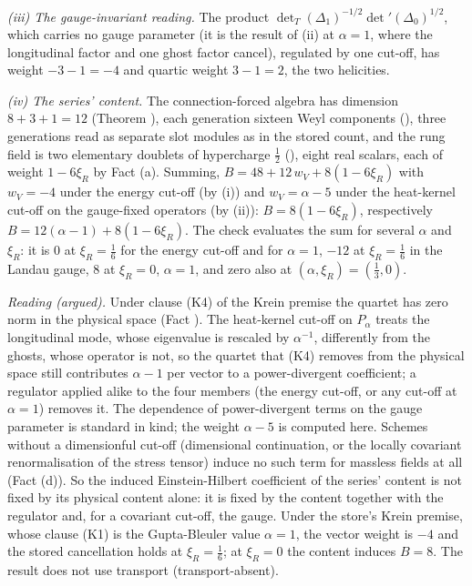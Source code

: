 \emph{(iii) The gauge-invariant reading.} The product $\det_{T}(\Delta_{1})^{-1/2}\det{}'(\Delta_{0})^{1/2}$, which carries no gauge parameter (it is the result of (ii) at $\alpha = 1$, where the longitudinal factor and one ghost factor cancel), regulated by one cut-off, has weight $-3 - 1 = -4$ and quartic weight $3 - 1 = 2$, the two helicities.

\emph{(iv) The series' content.} The connection-forced algebra has dimension $8 + 3 + 1 = 12$ (Theorem ), each generation sixteen Weyl components (), three generations read as separate slot modules as in the stored count, and the rung field is two elementary doublets of hypercharge $\tfrac12$ (), eight real scalars, each of weight $1 - 6\xi_{R}$ by Fact (a). Summing, $B = 48 + 12\,w_{V} + 8(1 - 6\xi_{R})$ with $w_{V} = -4$ under the energy cut-off (by (i)) and $w_{V} = \alpha - 5$ under the heat-kernel cut-off on the gauge-fixed operators (by (ii)): $B = 8(1 - 6\xi_{R})$, respectively $B = 12(\alpha - 1) + 8(1 - 6\xi_{R})$. The check evaluates the sum for several $\alpha$ and $\xi_{R}$: it is $0$ at $\xi_{R} = \tfrac16$ for the energy cut-off and for $\alpha = 1$, $-12$ at $\xi_{R} = \tfrac16$ in the Landau gauge, $8$ at $\xi_{R} = 0$, $\alpha = 1$, and zero also at $(\alpha, \xi_{R}) = (\tfrac13, 0)$.

\emph{Reading (argued).} Under clause (K4) of the Krein premise the quartet has zero norm in the physical space (Fact ). The heat-kernel cut-off on $P_{\alpha}$ treats the longitudinal mode, whose eigenvalue is rescaled by $\alpha^{-1}$, differently from the ghosts, whose operator is not, so the quartet that (K4) removes from the physical space still contributes $\alpha - 1$ per vector to a power-divergent coefficient; a regulator applied alike to the four members (the energy cut-off, or any cut-off at $\alpha = 1$) removes it. The dependence of power-divergent terms on the gauge parameter is standard in kind; the weight $\alpha - 5$ is computed here. Schemes without a dimensionful cut-off (dimensional continuation, or the locally covariant renormalisation of the stress tensor) induce no such term for massless fields at all (Fact (d)). So the induced Einstein-Hilbert coefficient of the series' content is not fixed by its physical content alone: it is fixed by the content together with the regulator and, for a covariant cut-off, the gauge. Under the store's Krein premise, whose clause (K1) is the Gupta-Bleuler value $\alpha = 1$, the vector weight is $-4$ and the stored cancellation holds at $\xi_{R} = \tfrac16$; at $\xi_{R} = 0$ the content induces $B = 8$. The result does not use transport (transport-absent).
